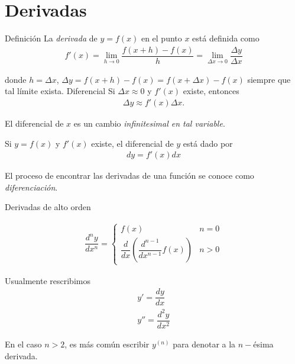 \section{Derivadas}

{Definición}
  La \emph{derivada} de $y=f(x)$ en el punto $x$ está definida como
  \begin{align}
   f'(x)= \lim_{h\to 0}\dfrac{f(x+h)-f(x)}{h} 
   = \lim_{\Delta x \to 0}\dfrac{\Delta y}{\Delta x}
   \end{align}

donde $h=\Delta x$, $\Delta y=f(x+h)-f(x)=f(x+\Delta x)-f(x)$ siempre que tal límite exista.
{Diferencial}
  Si $\Delta x \approx 0$ y $f'(x)$ existe, entonces 
  \begin{align}
   \Delta y \approx f'(x) \Delta x.
   \end{align}

{}
   El diferencial de $x$ es un cambio \emph{infinitesimal  en tal variable}. 

{}
  \begin{defn}
   Si $y = f(x)$ y $f'(x)$ existe, el diferencial de $y$ está dado por
   \begin{align}
    dy = f'(x)dx
    \end{align}
  \end{defn}


{}
  El proceso de encontrar las derivadas de una función se conoce como \emph{diferenciación}.

{Derivadas de alto orden}
  \begin{defn}
   \begin{align}
    \dfrac{d^{n}y}{dx^{n}}= 
    \begin{cases}
f(x) & n=0 \\
\dfrac{d}{dx}\left( \dfrac{d^{n-1}}{dx^{n-1}}f(x) \right) & n>0
\end{cases}
    \end{align}
  \end{defn}


{}
  Usualmente rescribimos 
  \begin{align}
   y' = \dfrac{dy}{dx} \\
   y'' = \dfrac{d^{2}y}{dx^{2}}    
   \end{align}
   
   En el caso $n>2$, es más común escribir
 $   y^{(n)}$ para denotar a la $n-$ésima derivada. 

